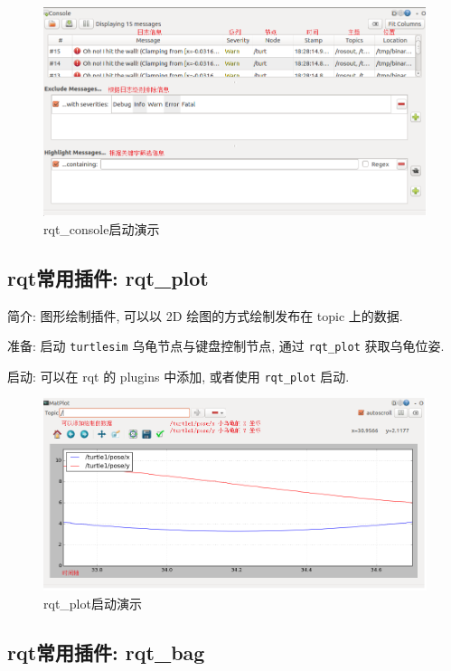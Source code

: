 \documentclass[openany, fontset=windowsold]{ctexbook}
\theoremstyle{kaiti}
\theoremstyle{normal}
\begin{document}
\begin{figure}[!ht]
  \centering
  \includegraphics[width=.9\textwidth]{ros_rqt_console.png}
  \caption{rqt\_console启动演示}
  \label{fig:ros_rqt_console}
\end{figure}

\subsection{rqt常用插件: rqt\_plot}

简介: 图形绘制插件, 可以以 2D 绘图的方式绘制发布在 topic 上的数据.

准备: 启动 \verb|turtlesim| 乌龟节点与键盘控制节点, 通过 \verb|rqt_plot| 获取乌龟位姿.

启动: 可以在 rqt 的 plugins 中添加, 或者使用 \verb|rqt_plot| 启动.

\begin{figure}[!ht]
  \centering
  \includegraphics[width=.9\textwidth]{ros_rqt_plot.png}
  \caption{rqt\_plot启动演示}
  \label{fig:ros_rqt_plot}
\end{figure}

\subsection{rqt常用插件: rqt\_bag}
\end{document}
